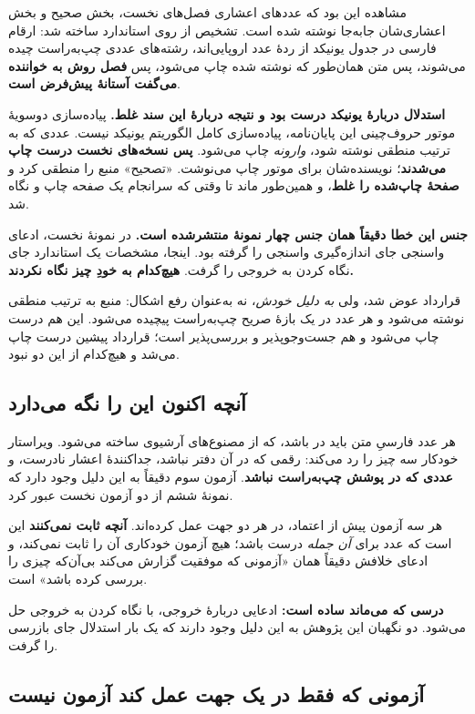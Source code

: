 مشاهده این بود که عددهای اعشاری فصل‌های نخست، بخش صحیح و بخش اعشاری‌شان جابه‌جا نوشته شده است.
تشخیص از روی استاندارد ساخته شد: ارقام فارسی در جدول یونیکد از ردهٔ عدد اروپایی‌اند، رشته‌های
عددی چپ‌به‌راست چیده می‌شوند، پس متن همان‌طور که نوشته شده چاپ می‌شود، پس
\textbf{فصل روش به خواننده می‌گفت آستانهٔ پیش‌فرض  است}.

\textbf{استدلال دربارهٔ یونیکد درست بود و نتیجه دربارهٔ این سند غلط.} پیاده‌سازی دوسویهٔ
موتور حروف‌چینی این پایان‌نامه، پیاده‌سازی کامل الگوریتم یونیکد نیست. عددی که به ترتیب منطقی
نوشته شود، \emph{وارونه} چاپ می‌شود. \textbf{پس نسخه‌های نخست درست چاپ می‌شدند}؛ نویسنده‌شان
برای موتور چاپ می‌نوشت. «تصحیح» منبع را منطقی کرد و \textbf{صفحهٔ چاپ‌شده را غلط}، و همین‌طور
ماند تا وقتی که سرانجام یک صفحه چاپ و نگاه شد.

\textbf{جنس این خطا دقیقاً همان جنس چهار نمونهٔ منتشرشده است.} در نمونهٔ نخست، ادعای واسنجی
جای اندازه‌گیری واسنجی را گرفته بود. اینجا، مشخصات یک استاندارد جای نگاه کردن به خروجی را
گرفت. \textbf{هیچ‌کدام به خودِ چیز نگاه نکردند.}

قرارداد عوض شد، ولی \emph{به دلیل خودش}، نه به‌عنوان رفع اشکال: منبع به ترتیب منطقی نوشته
می‌شود و هر عدد در یک بازهٔ صریح چپ‌به‌راست پیچیده می‌شود. این هم درست چاپ می‌شود و هم
جست‌وجوپذیر و بررسی‌پذیر است؛ قرارداد پیشین درست چاپ می‌شد و هیچ‌کدام از این دو نبود.

\subsection{آنچه اکنون این را نگه می‌دارد}

هر عدد فارسیِ متن باید در  باشد، که از مصنوع‌های
آرشیوی ساخته می‌شود. ویراستار خودکار سه چیز را رد می‌کند: رقمی که در آن دفتر نباشد، جداکنندهٔ
اعشار نادرست، و \textbf{عددی که در پوشش چپ‌به‌راست نباشد}. آزمون سوم دقیقاً به این دلیل وجود
دارد که نمونهٔ ششم از دو آزمون نخست عبور کرد.

هر سه آزمون پیش از اعتماد، در هر دو جهت عمل کرده‌اند. \textbf{آنچه ثابت نمی‌کنند} این است که
عدد برای \emph{آن جمله} درست باشد؛ هیچ آزمون خودکاری آن را ثابت نمی‌کند، و ادعای خلافش دقیقاً
همان «آزمونی که موفقیت گزارش می‌کند بی‌آن‌که چیزی را بررسی کرده باشد» است.

\textbf{درسی که می‌ماند ساده است:} ادعایی دربارهٔ خروجی، با نگاه کردن به خروجی حل می‌شود. دو
نگهبان این پژوهش به این دلیل وجود دارند که یک بار استدلال جای بازرسی را گرفت.

\subsection{آزمونی که فقط در یک جهت عمل کند آزمون نیست}

